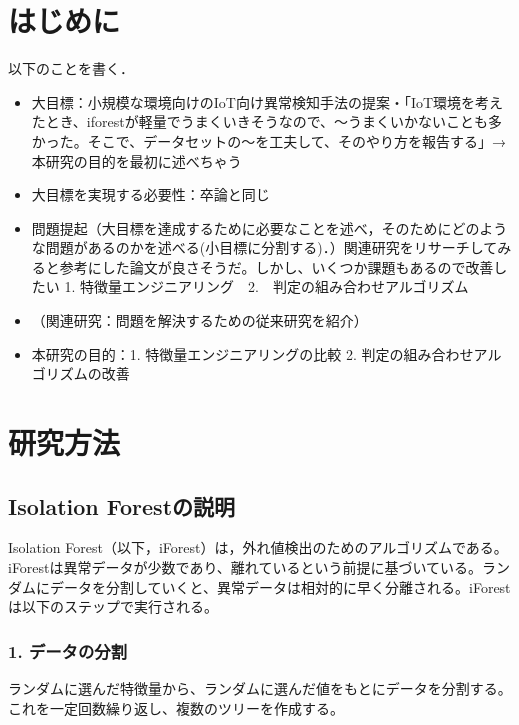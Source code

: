 \documentclass{css}
\begin{document}
\maketitle

\section{はじめに}
以下のことを書く．

\begin{itemize}
    \item 大目標：小規模な環境向けのIoT向け異常検知手法の提案・「IoT環境を考えたとき、iforestが軽量でうまくいきそうなので、〜うまくいかないことも多かった。そこで、データセットの〜を工夫して、そのやり方を報告する」→本研究の目的を最初に述べちゃう
    \item 大目標を実現する必要性：卒論と同じ
    \item 問題提起（大目標を達成するために必要なことを述べ，そのためにどのような問題があるのかを述べる(小目標に分割する)．）関連研究をリサーチしてみると参考にした論文が良さそうだ。しかし、いくつか課題もあるので改善したい
    1. 特徴量エンジニアリング　2.　判定の組み合わせアルゴリズム 
    \item （関連研究：問題を解決するための従来研究を紹介）
    \item 本研究の目的：1. 特徴量エンジニアリングの比較 2. 判定の組み合わせアルゴリズムの改善
\end{itemize}




\section{研究方法}

\subsection{Isolation Forestの説明}
Isolation Forest（以下，iForest）は，外れ値検出のためのアルゴリズムである。iForestは異常データが少数であり、離れているという前提に基づいている。ランダムにデータを分割していくと、異常データは相対的に早く分離される。iForestは以下のステップで実行される。

\subsubsection*{1. データの分割}
ランダムに選んだ特徴量から、ランダムに選んだ値をもとにデータを分割する。これを一定回数繰り返し、複数のツリーを作成する。
\end{document}
